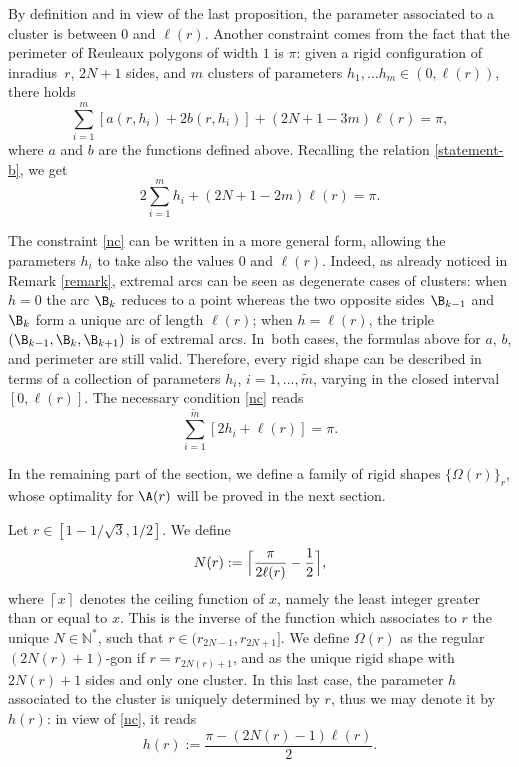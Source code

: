 By definition and in view of the last proposition, the parameter associated to a cluster is between $0$ and $\ell(r)$. Another constraint comes from the fact that the perimeter of Reuleaux polygons of width $1$ is $\pi$: given a rigid configuration of inradius~$r$, $2N+1$ sides, and $m$ clusters of parameters $h_1, \ldots h_m \in (0,\ell(r))$, there holds
\[
\sum_{i=1}^m [a(r,h_i) + 2 b(r,h_i)] + (2N+1-3m)\ell(r)=\pi,
\]
where $a$ and $b$ are the functions defined above. Recalling the relation \eqref{statement-b}, we get
\begin{equation}\label{nc}
2 \sum_{i=1}^m h_i + (2N+1-2m)\ell(r)= \pi.
\end{equation}

\begin{remark}\label{rem-cluster}
The constraint \eqref{nc} can be written in a more general form, allowing the parameters $h_i$ to take also the values $0$ and $\ell(r)$. Indeed, as already noticed in Remark \ref{remark}, extremal arcs can be seen as degenerate cases of clusters: when $h=0$ the arc $\B_k$ reduces to a point whereas the two opposite sides $\B_{k-1}$ and $\B_k$ form a unique arc of length $\ell(r)$; when $h=\ell(r)$, the triple $(\B_{k-1},\B_k, \B_{k+1})$ is of extremal arcs. In~both cases, the formulas above for $a$, $b$, and perimeter are still valid. Therefore, every rigid shape can be described in terms of a collection of parameters $h_i$, $i=1,\ldots, \tilde{m}$, varying in the closed interval $[0,\ell(r)]$. The necessary condition \eqref{nc} reads
\begin{equation}\label{nc2}
\sum_{i=1}^{\tilde m} [2 h_i + \ell(r)]= \pi.
\end{equation}
\end{remark}

In the remaining part of the section, we define a family of rigid shapes $\{\Omega(r)\}_r$, whose optimality for $\A(r)$ will be proved in the next section.
\begin{definition}\label{def-optimals} Let $r\in [1-1/\sqrt{3}, 1/2]$. We define
\begin{equation}\label{def-N}
N(r):=\Bigl \lceil{ \frac{\pi}{2\ell(r)}-\frac12 }\Bigr \rceil,
\end{equation}
where $\left \lceil{x}\right \rceil$ denotes the ceiling function of $x$, namely the least integer greater than or equal to $x$. This is the inverse of the function which associates to $r$ the unique $N\in \mathbb N^*$, such that $r\in (r_{2N-1}, r_{2N+1}]$.
We define $\Omega(r)$ as the regular $(2N(r)+1)$-gon if $r=r_{2N(r)+1}$, and as the unique rigid shape with $2N(r)+1$ sides and only one cluster. In this last case, the parameter $h$ associated to the cluster is uniquely determined by $r$, thus we may denote it by $h(r)$: in view of \eqref{nc}, it reads
\begin{equation}\label{uniqueh}
h(r):= \frac{\pi - (2N(r)-1)\ell(r)}{2}.
\end{equation}
\end{definition}

